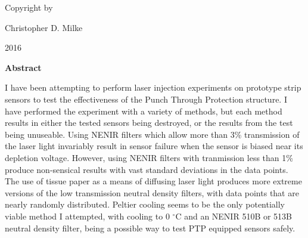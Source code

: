 \documentclass{report}
\begin{document}
    \newpage \begin{center} 
        \vspace*{\fill}
        Copyright \textcopyright by

        Christopher D. Milke 

        2016
        \vspace*{\fill}
    \end{center} \newpage


        \begin{center} \LARGE \textbf{Abstract} \end{center}
        I have been attempting to perform laser injection experiments on prototype strip sensors to test the effectiveness of the Punch Through Protection structure. I have performed the experiment with a variety of methods, but each method results in either the tested sensors being destroyed, or the results from the test being unuseable. Using NENIR filters which allow more than 3\% transmission of the laser light invariably result in sensor failure when the sensor is biased near its depletion voltage. However, using NENIR filters with tranmission less than 1\% produce non-sensical results with vast standard deviations in the data points. The use of tissue paper as a means of diffusing laser light produces more extreme versions of the low transmission neutral density filters, with data points that are nearly randomly distributed. Peltier cooling seems to be the only potentially viable method I attempted, with cooling to 0 $^\circ$C and an NENIR 510B or 513B neutral density filter, being a possible way to test PTP equipped sensors safely.



    \newpage


    \tableofcontents
\end{document}
